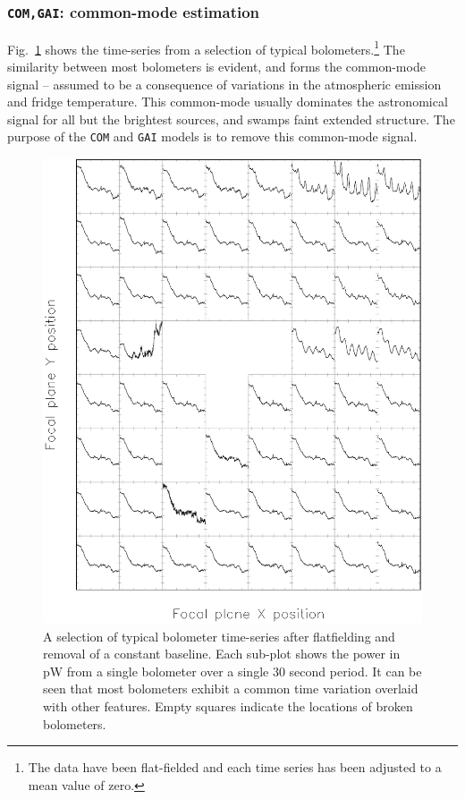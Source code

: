 \documentclass[useAMS,usenatbib,nofootinbib]{mn2e}
\newcommand{\model}[1]{\texttt{#1}}
\begin{document}
\subsubsection{\model{COM,GAI}: common-mode estimation}
\label{sec:comgai}

﻿Fig.~\ref{fig:com} shows the time-series from a selection of typical
bolometers.\footnote{The data have been flat-fielded and each time
series has been adjusted to a mean value of zero.} The similarity
between most bolometers is evident, and forms the common-mode signal
-- assumed to be a consequence of variations in the atmospheric
emission and fridge temperature. This common-mode usually dominates
the astronomical signal for all but the brightest sources, and swamps
faint extended structure.  The purpose of the \model{COM} and
\model{GAI} models is to remove this common-mode signal.

\begin{figure}
\centering
\includegraphics[width=\linewidth]{com}
\caption{A selection of typical bolometer time-series after
flatfielding and removal of a constant baseline. Each sub-plot shows 
the power in pW from a single bolometer over a single 30 second period.  
It can be seen that most bolometers exhibit a common time variation overlaid with other
features. Empty squares indicate the locations of broken bolometers.}
\label{fig:com}
\end{figure}
\end{document}
